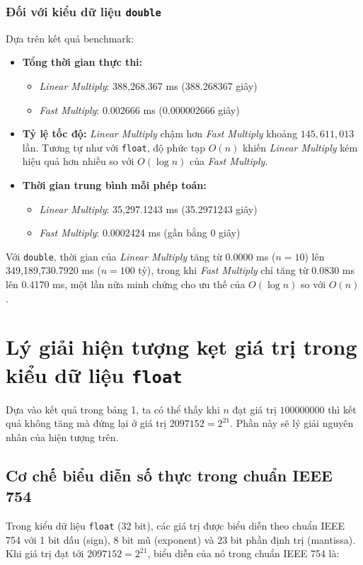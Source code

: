 \subsubsection{Đối với kiểu dữ liệu \texttt{double}}
Dựa trên kết quả benchmark:
\begin{itemize}
    \item \textbf{Tổng thời gian thực thi:}
    \begin{itemize}
        \item \textit{Linear Multiply}: 388,268.367 ms (388.268367 giây)
        \item \textit{Fast Multiply}: 0.002666 ms (0.000002666 giây)
    \end{itemize}
    \item \textbf{Tỷ lệ tốc độ:} \textit{Linear Multiply} chậm hơn \textit{Fast Multiply} khoảng $145,611,013$ lần. Tương tự như với \texttt{float}, độ phức tạp $O(n)$ khiến \textit{Linear Multiply} kém hiệu quả hơn nhiều so với $O(\log n)$ của \textit{Fast Multiply}.
    \item \textbf{Thời gian trung bình mỗi phép toán:}
    \begin{itemize}
        \item \textit{Linear Multiply}: 35,297.1243 ms (35.2971243 giây)
        \item \textit{Fast Multiply}: 0.0002424 ms (gần bằng 0 giây)
    \end{itemize}
\end{itemize}

Với \texttt{double}, thời gian của \textit{Linear Multiply} tăng từ 0.0000 ms ($n=10$) lên 349,189,730.7920 ms ($n=100$ tỷ), trong khi \textit{Fast Multiply} chỉ tăng từ 0.0830 ms lên 0.4170 ms, một lần nữa minh chứng cho ưu thế của $O(\log n)$ so với $O(n)$.
\section{Lý giải hiện tượng kẹt giá trị trong kiểu dữ liệu \texttt{float}}
Dựa vào kết quả trong bảng 1, ta có thể thấy khi $n$ đạt giá trị $100000000$ thì kết quả không tăng mà đứng lại ở giá trị $2097152 = 2^{21}$. Phần này sẽ lý giải nguyên nhân của hiện tượng trên.
\subsection{Cơ chế biểu diễn số thực trong chuẩn IEEE 754}
Trong kiểu dữ liệu \texttt{float} (32 bit), các giá trị được biểu diễn theo chuẩn IEEE 754 với 1 bit dấu (sign), 8 bit mũ (exponent) và 23 bit phần định trị (mantissa). Khi giá trị đạt tới $2097152 = 2^{21}$, biểu diễn của nó trong chuẩn IEEE 754 là:

